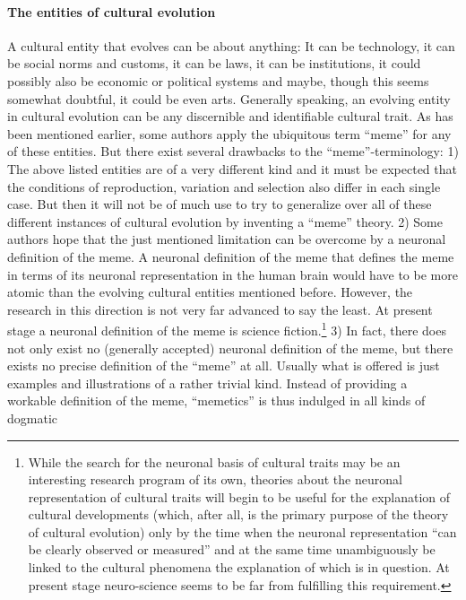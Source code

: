 \paragraph{The entities of cultural evolution} 

A cultural entity that evolves can be about anything: It can be
technology, it can be social norms and customs, it can be laws, it can
be institutions, it could possibly also be economic or political
systems and maybe, though this seems somewhat doubtful, it could be
even arts. Generally speaking, an evolving entity in cultural
evolution can be any discernible and identifiable cultural trait.  As
has been mentioned earlier, some authors apply the ubiquitous term
``meme'' for any of these entities. But there exist several drawbacks
to the ``meme''-terminology: \label{drawbacksOfMemetics} 1) The above
listed entities are of a very different kind and it must be expected
that the conditions of reproduction, variation and selection also
differ in each single case. But then it will not be of much use to try
to generalize over all of these different instances of cultural
evolution by inventing a ``meme'' theory. 2) Some authors hope that
the just mentioned limitation can be overcome by a neuronal definition
of the meme. A neuronal definition of the meme that defines the meme
in terms of its neuronal representation in the human brain would have
to be more atomic than the evolving cultural entities mentioned
before. However, the research in this direction is not very far
advanced to say the least. At present stage a neuronal definition of
the meme is science fiction.\footnote{While the search for the
  neuronal basis of cultural traits may be an interesting research
  program of its own, theories about the neuronal representation of
  cultural traits will begin to be useful for the explanation of
  cultural developments (which, after all, is the primary purpose of
  the theory of cultural evolution) only by the time when the neuronal
  representation ``can be clearly observed or measured'' and at the
  same time unambiguously be linked to the cultural phenomena the
  explanation of which is in question. At present stage neuro-science
  seems to be far from fulfilling this requirement.} 3) In fact, there
does not only exist no (generally accepted) neuronal definition of the
meme, but there exists no precise definition of the ``meme'' at
all. Usually what is offered is just examples and illustrations of a
rather trivial kind. Instead of providing a workable definition of the
meme, ``memetics'' is thus indulged in all kinds of dogmatic
